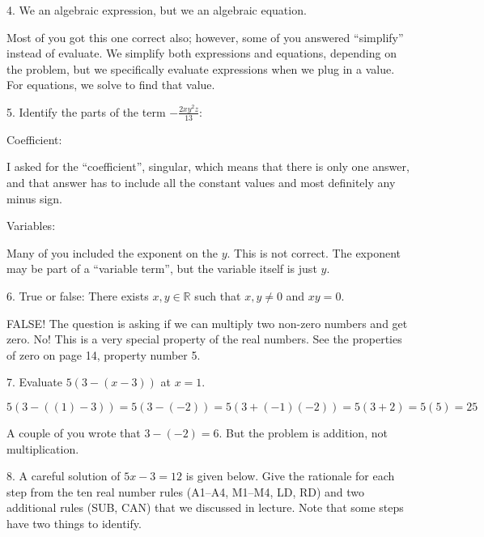 \documentclass[letterpaper, 12pt]{article}
\begin{document}
\bigskip

4. We  an algebraic expression, but we  an
algebraic equation.

\bigskip

Most of you got this one correct also; however, some of you answered
``simplify'' instead of evaluate.  We simplify both expressions and equations,
depending on the problem, but we specifically evaluate expressions when we plug
in a value.  For equations, we solve to find that value.

\bigskip

5. Identify the parts of the term $-\frac{2xy^2z}{13}$:

\bigskip

Coefficient: 

\bigskip

I asked for the ``coefficient'', singular, which means that there is only one
answer, and that answer has to include all the constant values and most
definitely any minus sign.

\bigskip

Variables: 

\bigskip

Many of you included the exponent on the $y$.  This is not correct.  The
exponent may be part of a ``variable term'', but the variable itself is just
$y$.

\bigskip

6. True or false: There exists $x,y\in\mathbb{R}$ such that $x,y\ne0$ and
$xy=0$.

\bigskip

FALSE!  The question is asking if we can multiply two non-zero numbers and get
zero. No! This is a very special property of the real numbers.  See the
properties of zero on page 14, property number 5.

\bigskip

7. Evaluate $5(3-(x-3))$ at $x=1$.

\bigskip

$5(3-((1)-3))=5(3-(-2))=5(3+(-1)(-2))=5(3+2)=5(5)=25$

\bigskip

A couple of you wrote that $3-(-2) = 6$.  But the problem is addition, not
multiplication.

\bigskip

8. A careful solution of $5x-3=12$ is given below. Give the rationale for each
step from the ten real number rules (A1--A4, M1--M4, LD, RD) and two additional
rules (SUB, CAN) that we discussed in lecture.  Note that some steps have two
things to identify.
\end{document}
